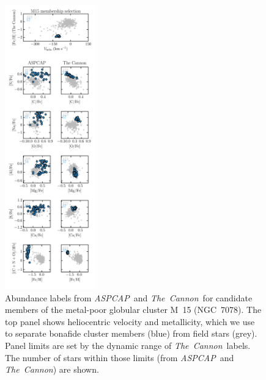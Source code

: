 \documentclass[12pt,preprint]{aastex6}
\newcommand{\project}[1]{\textsl{#1}}
\newcommand{\TheCannon}{\project{The~Cannon}}
\newcommand{\acronym}[1]{{\small{#1}}}
\newcommand{\aspcap}{\project{\acronym{ASPCAP}}}
\begin{document}
\begin{figure}[p]
\centering
\includegraphics[width=0.35\textwidth]{M15_comparison.pdf}
\caption{Abundance labels from \aspcap\ and \TheCannon\ for candidate
members of the metal-poor globular cluster M~15 (NGC~7078).  The top panel
shows heliocentric velocity and metallicity, which we use to separate
bonafide cluster members (blue) from field stars (grey). Panel limits
are set by the dynamic range of \TheCannon\ labels.  The number of stars
within those limits (from \aspcap\ and \TheCannon) are shown.\label{fig:m15-comparison}}
\end{figure}

\clearpage
\end{document}
